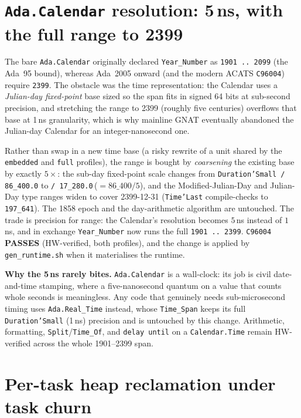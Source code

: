 \section{\texttt{Ada.Calendar} resolution: 5\,ns, with the full range to 2399}

The bare \texttt{Ada.Calendar} originally declared \texttt{Year\_Number} as
\texttt{1901\,..\,2099} (the Ada~95 bound), whereas Ada~2005 onward (and the
modern ACATS \texttt{C96004}) require \texttt{2399}. The obstacle was the time
representation: the Calendar uses a \emph{Julian-day fixed-point} base sized so the
span fits in signed 64 bits at sub-second precision, and stretching the range to
2399 (roughly five centuries) overflows that base at 1\,ns granularity, which is
why mainline GNAT eventually abandoned the Julian-day Calendar for an
integer-nanosecond one.

Rather than swap in a new time base (a risky rewrite of a unit shared by the
\texttt{embedded} and \texttt{full} profiles), the range is bought by
\emph{coarsening} the existing base by exactly $5\times$: the sub-day fixed-point
scale changes from \texttt{Duration'Small\,/\,86\_400.0} to
\texttt{/\,17\_280.0}\,($=86\_400/5$), and the Modified-Julian-Day and Julian-Day
type ranges widen to cover 2399-12-31 (\texttt{Time'Last} compile-checks to
\texttt{197\_641}). The 1858 epoch and the day-arithmetic algorithm are untouched.
The trade is precision for range: the Calendar's resolution becomes $5$\,ns instead
of $1$\,ns, and in exchange \texttt{Year\_Number} now runs the full
\texttt{1901\,..\,2399}. \texttt{C96004} \textbf{PASSES} (HW-verified, both
profiles), and the change is applied by \texttt{gen\_runtime.sh} when it
materialises the runtime.

\textbf{Why the 5\,ns rarely bites.} \texttt{Ada.Calendar} is a wall-clock: its job
is civil date-and-time stamping, where a five-nanosecond quantum on a value that
counts whole seconds is meaningless. Any code that genuinely needs sub-microsecond
timing uses \texttt{Ada.Real\_Time} instead, whose \texttt{Time\_Span} keeps its
full \texttt{Duration'Small} (1\,ns) precision and is untouched by this change.
Arithmetic, formatting, \texttt{Split}/\texttt{Time\_Of}, and \texttt{delay until}
on a \texttt{Calendar.Time} remain HW-verified across the whole 1901--2399 span.

\section{Per-task heap reclamation under task churn}

